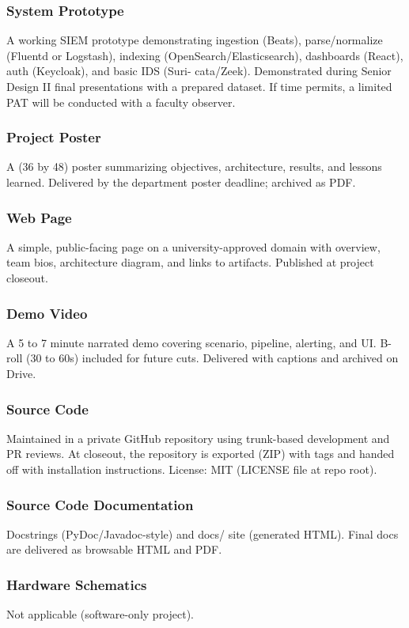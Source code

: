 \subsubsection{System Prototype}
A working SIEM prototype demonstrating ingestion (Beats), parse/normalize (Fluentd or Logstash),
indexing (OpenSearch/Elasticsearch), dashboards (React), auth (Keycloak), and basic IDS (Suri-
cata/Zeek). Demonstrated during Senior Design II final presentations with a prepared dataset. If
time permits, a limited PAT will be conducted with a faculty observer.

\subsubsection{Project Poster}
A (36 by 48) poster summarizing objectives, architecture, results, and lessons learned. Delivered by
the department poster deadline; archived as PDF.

\subsubsection{Web Page}
A simple, public-facing page on a university-approved domain with overview, team bios, architecture
diagram, and links to artifacts. Published at project closeout.

\subsubsection{Demo Video}
A 5 to 7 minute narrated demo covering scenario, pipeline, alerting, and UI. B-roll (30 to 60s) included
for future cuts. Delivered with captions and archived on Drive.

\subsubsection{Source Code}
Maintained in a private GitHub repository using trunk-based development and PR reviews. At
closeout, the repository is exported (ZIP) with tags and handed off with installation instructions.
License: MIT (LICENSE file at repo root).

\subsubsection{Source Code Documentation}
Docstrings (PyDoc/Javadoc-style) and docs/ site (generated HTML). Final docs are delivered as
browsable HTML and PDF.

\subsubsection{Hardware Schematics}
Not applicable (software-only project).

